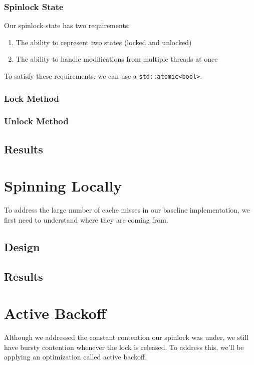 \documentclass[11pt,fancy,authoryear]{elegantbook}
\begin{document}
\subsection{Spinlock State}

Our spinlock state has two requirements:

\begin{enumerate}
  \item The ability to represent two states (locked and unlocked)
  \item The ability to handle modifications from multiple threads at once
\end{enumerate}

To satisfy these requirements, we can use a \lstinline{std::atomic<bool>}.

\subsection{Lock Method}

\subsection{Unlock Method}

\section{Results}

\chapter{Spinning Locally}

To address the large number of cache misses in our baseline implementation, we first need to understand where they are coming from.

\section{Design}

\section{Results}

\chapter{Active Backoff}

Although we addressed the constant contention our spinlock was under, we still have bursty contention whenever the lock is released. To address this, we'll be applying an optimization called active backoff.
\end{document}
